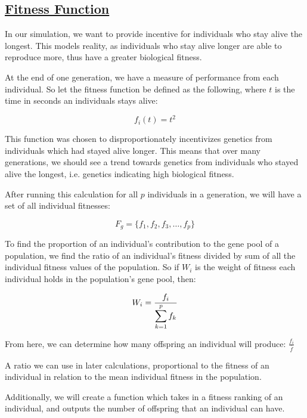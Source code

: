 \newpage
\subsection{\underline{Fitness Function}}

In our simulation, we want to provide incentive for individuals who stay alive the longest. This models reality, as individuals who stay alive longer are able to reproduce more, thus have a greater biological fitness.

\ms
\nid At the end of one generation, we have a measure of performance from each individual. So let the fitness function be defined as the following, where $t$ is the time in seconds an individuals stays alive:

$$f_i(t)=t^2$$

\ms
\nid This function was chosen to disproportionately incentivizes genetics from individuals which had stayed alive longer. This means that over many generations, we should see a trend towards genetics from individuals who stayed alive the longest, i.e. genetics indicating high biological fitness. 

\ms
\nid After running this calculation for all $p$ individuals in a generation, we will have a set of all individual fitnesses:

$$
F_g=\{f_1, f_2, f_3, \ldots, f_{p}\}
$$

\nid To find the proportion of an individual's contribution to the gene pool of a population, we find the ratio of an individual's fitness divided by sum of all the individual fitness values of the population. So if $W_i$ is the weight of fitness each individual holds in the population's gene pool, then:

$$
W_i=\frac{f_i}{\mathlarger{\sum_{k=1}^{p} f_k}}
$$

\nid From here, we can determine how many offspring an individual will produce: 
$\frac{f_i}{\bar{f}}$
\bi
\item A ratio we can use in later calculations, proportional to the fitness of an individual in relation to the mean individual fitness in the population.
\ei

\ms
\nid Additionally, we will create a function which takes in a fitness ranking of an individual, and outputs the number of offspring that an individual can have.